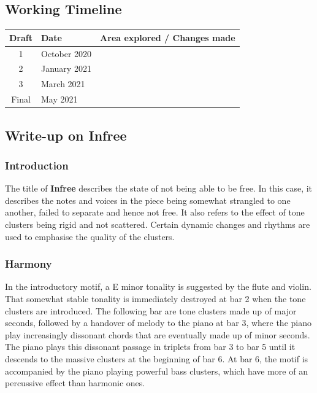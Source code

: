 \documentclass{article}
\begin{document}
\newpage

\subsection{Working Timeline}
\begin{center}
	\def\arraystretch{1.5}
\begin{tabular}{|c|l|l|}
	\hline
	Draft&Date&Area explored / Changes made\\
	\hline
	1&October 2020&\\
	\hline
	2&January 2021&\\
	\hline
	3&March 2021&\\
	\hline
	Final&May 2021&\\
	\hline
\end{tabular}
\end{center}

\subsection{Write-up on {\bf Infree}}

\subsubsection{Introduction}

The title of \textbf{Infree} describes the state of not being able to be free.
In this case, it describes the notes and voices in the piece being somewhat
strangled to one another, failed to separate and hence not free.
It also refers to the effect of tone clusters being rigid and not
scattered. Certain dynamic changes and rhythms are used to emphasise
the quality of the clusters.

\subsubsection{Harmony}

In the introductory motif,
a E minor tonality is suggested by the flute and violin.
That somewhat stable tonality is immediately destroyed at bar 2
when the tone clusters are introduced.
The following bar are tone clusters made up of major seconds,
followed by a handover of melody to the piano at bar 3,
where the piano play increasingly dissonant chords that are
eventually made up of minor seconds.\\

The piano plays this dissonant passage in triplets from bar 3 to bar 5
until it descends to the massive clusters at the beginning of bar 6.
At bar 6, the motif is accompanied by the piano playing powerful bass clusters,
which have more of an percussive effect than harmonic ones.\\
\end{document}
